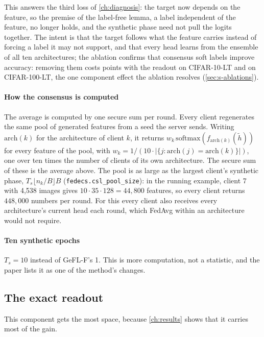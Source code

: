 This answers the third loss of \cref{ch:diagnosis}: the target now depends on the feature, so the premise of the
label-free lemma, a label independent of the feature, no longer holds, and the synthetic phase need not pull the logits
together. The intent is that the target follows what the feature carries instead of forcing a label it may not
support, and that every head learns from the ensemble of all ten architectures; the ablation confirms that consensus soft labels
improve accuracy: removing them costs  points with the readout on
CIFAR-10-LT and  on CIFAR-100-LT, the one component effect the
ablation resolves (\cref{sec:s-ablations}).

\paragraph{How the consensus is computed} The average is computed by one secure sum per round. Every client
regenerates the same pool of generated features from a seed the server sends. Writing $\mathrm{arch}(k)$ for the architecture
of client $k$, it returns $w_k\,\mathrm{softmax}(f_{\mathrm{arch}(k)}(\tilde h))$ for every feature of the pool, with
$w_k=1/(10\cdot|\{j:\mathrm{arch}(j)=\mathrm{arch}(k)\}|)$, one over ten times the number of clients of its own architecture. The secure sum of
these is the average above. The pool is as large as the largest client's synthetic phase, $T_s\lfloor n_k/B\rfloor B$
(\texttt{fedecs.csl\_pool\_size}): in the running example, client 7 with 4,538 images gives
$10\cdot35\cdot128=44{,}800$ features, so every client returns $448{,}000$ numbers per round. For this every client also
receives every architecture's current head each round, which FedAvg within an architecture would not require.

\paragraph{Ten synthetic epochs} $T_s=10$ instead of GeFL-F's 1. This is more computation, not a statistic, and the
paper lists it as one of the method's changes.

\subsection{The exact readout}\label{sec:s-readout}

This component gets the most space, because \cref{ch:results} shows that it carries most of the gain.

